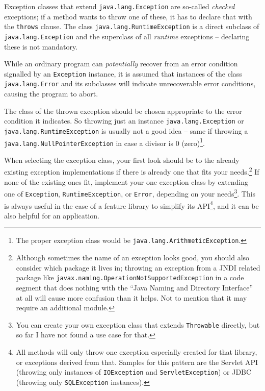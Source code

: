 \documentclass[11pt,a4paper, titlepage, parskip=half, headsepline, footsepline, cleardoublepage=current, headheight=1cm]{scrbook}
\begin{document}
Exception classes that extend \lstinline|java.lang.Exception| are so-called \textit{checked} exceptions; if a method wants to throw one of these, it has to declare that with the \lstinline|throws| clause. The class \lstinline|java.lang.RuntimeException| is a direct subclass of \lstinline|java.lang.Exception| and the superclass of all \textit{runtime} exceptions – declaring these is not mandatory.

While an ordinary program can \textit{potentially} recover from an error condition signalled by an \lstinline|Exception| instance, it is assumed that instances of the class \lstinline|java.lang.Error| and its subclasses will indicate unrecoverable error conditions, causing the program to abort.

The class of the thrown exception should be chosen appropriate to the error condition it indicates. So throwing just an instance  \lstinline|java.lang.Exception| or \lstinline|java.lang.RuntimeException| is usually not a good idea – same if throwing a \lstinline|java.lang.NullPointerException|\autocite{ORACLE_DOC_NULLPOINTEREXCEPTION_CLASS} in case a divisor is 0 (zero)\footnote{The proper exception class would be \lstinline|java.lang.ArithmeticException|\autocite{ORACLE_DOC_ARITHMETICEXCEPTION_CLASS}.}.

When selecting the exception class, your first look should be to the already existing exception implementations if there is already one that fits your needs.\footnote{Although sometimes the name of an exception looks good, you should also consider which package it lives in; throwing an exception from a JNDI related package like \lstinline|javax.naming.OperationNotSupportedException| in a code segment that does nothing with the “Java Naming and Directory Interface” at all will cause more confusion than it helps. Not to mention that it may require an additional module.} If none of the existing ones fit, implement your one exception class by extending one of \lstinline|Exception|, \lstinline|RuntimeException|, or \lstinline|Error|, depending on your needs\footnote{You can create your own exception class that extends \lstinline|Throwable| directly, but so far I have not found a use case for that.}. This is always useful in the case of a feature library to simplify its API\footnote{All methods will only throw one exception especially created for that library, or exceptions derived from that. Samples for this pattern are the Servlet API (throwing only instances of \lstinline|IOException| and \lstinline|ServletException|) or JDBC (throwing only \lstinline|SQLException| instances).}, and it can be also helpful for an application.
\end{document}
